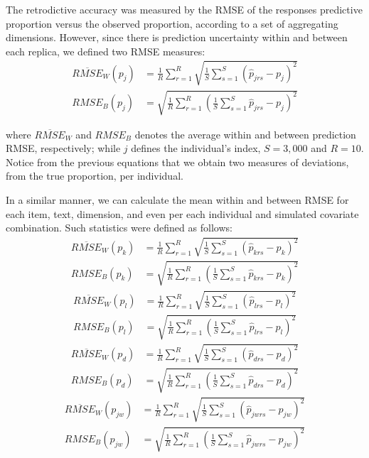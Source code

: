 The retrodictive accuracy was measured by the RMSE of the responses predictive proportion versus the observed proportion, according to a set of aggregating dimensions. However, since there is prediction uncertainty within and between each replica, we defined two RMSE measures:
%
\begin{align}
	\overline{RMSE}_{W} \left( p_{j} \right) &= \frac{1}{R} \sum_{r=1}^{R} \sqrt{ \frac{1}{S} \sum_{s=1}^{S} \left( \hat{p}_{jrs} - p_{j} \right)^2} \\
	RMSE_{B} \left( p_{j} \right) &= \sqrt{ \frac{1}{R} \sum_{r=1}^{R}  \left( \frac{1}{S} \sum_{s=1}^{S} \hat{p}_{jrs} - p_{j} \right)^2} 
\end{align}

\noindent where $\overline{RMSE}_{W}$ and $RMSE_{B}$ denotes the average within and between prediction RMSE, respectively; while $j$ defines the individual's index, $S=3,000$ and $R=10$. Notice from the previous equations that we obtain two measures of deviations, from the true proportion, per individual.

In a similar manner, we can calculate the mean within and between RMSE for each item, text, dimension, and even per each individual and simulated covariate combination. Such statistics were defined as follows:
%
\begin{align}
	\overline{RMSE}_{W} \left( p_{k} \right) &= \frac{1}{R} \sum_{r=1}^{R} \sqrt{ \frac{1}{S} \sum_{s=1}^{S} \left( \hat{p}_{krs} - p_{k} \right)^2} \\
	RMSE_{B} \left( p_{k} \right) &= \sqrt{ \frac{1}{R} \sum_{r=1}^{R}  \left( \frac{1}{S} \sum_{s=1}^{S} \hat{p}_{krs} - p_{k} \right)^2} 
\end{align}
%
\begin{align}
	\overline{RMSE}_{W} \left( p_{l} \right) &= \frac{1}{R} \sum_{r=1}^{R} \sqrt{ \frac{1}{S} \sum_{s=1}^{S} \left( \hat{p}_{lrs} - p_{l} \right)^2} \\
	RMSE_{B} \left( p_{l} \right) &= \sqrt{ \frac{1}{R} \sum_{r=1}^{R}  \left( \frac{1}{S} \sum_{s=1}^{S} \hat{p}_{lrs} - p_{l} \right)^2} 
\end{align}
%
\begin{align}
	\overline{RMSE}_{W} \left( p_{d} \right) &= \frac{1}{R} \sum_{r=1}^{R} \sqrt{ \frac{1}{S} \sum_{s=1}^{S} \left( \hat{p}_{drs} - p_{d} \right)^2} \\
	RMSE_{B} \left( p_{d} \right) &= \sqrt{ \frac{1}{R} \sum_{r=1}^{R}  \left( \frac{1}{S} \sum_{s=1}^{S} \hat{p}_{drs} - p_{d} \right)^2} 
\end{align}
%
\begin{align}
	\overline{RMSE}_{W} \left( p_{jw} \right) &= \frac{1}{R} \sum_{r=1}^{R} \sqrt{ \frac{1}{S} \sum_{s=1}^{S} \left( \hat{p}_{jwrs} - p_{jw} \right)^2} \\
	RMSE_{B} \left( p_{jw} \right) &= \sqrt{ \frac{1}{R} \sum_{r=1}^{R}  \left( \frac{1}{S} \sum_{s=1}^{S} \hat{p}_{jwrs} - p_{jw} \right)^2} 
\end{align}

